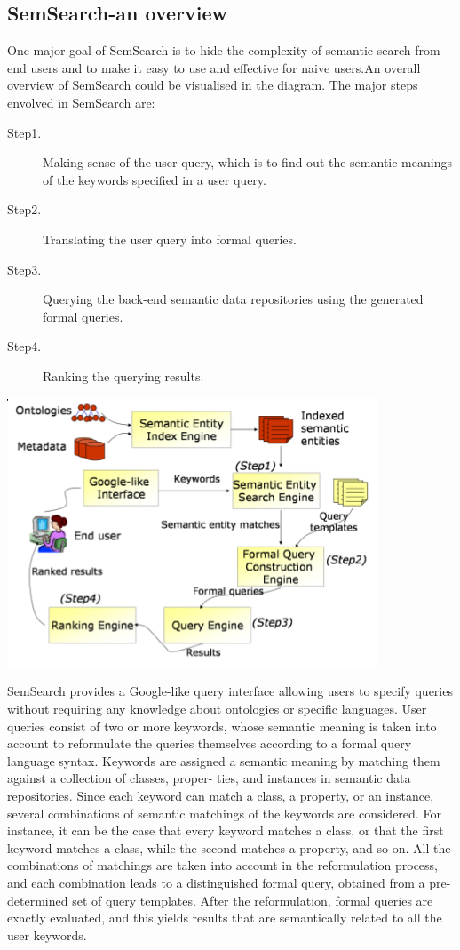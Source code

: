 \documentclass[12pt,a4]{article}
\begin{document}
\subsection{SemSearch-an overview\cite{semsrch}}
One major goal of SemSearch is to hide the complexity of semantic search from end users and to make it easy to use and effective for naive users.An overall overview of SemSearch could be visualised in the diagram. The major steps envolved in SemSearch are:
\begin{description}
\item[Step1.] Making sense of the user query, which is to find out the semantic meanings of the keywords specified in a user query.
\item[Step2.] Translating the user query into formal queries.
\item[Step3.] Querying the back-end semantic data repositories using the generated formal queries.
\item[Step4.] Ranking the querying results.
\end{description}
\begin{center}\includegraphics[height = 8cm]{./img/sem_srch.png}\end{center}
SemSearch provides a Google-like query interface allowing users to specify queries without requiring any knowledge about ontologies or specific languages. User queries consist of two or more keywords, whose semantic meaning is taken into account to reformulate the queries themselves according to a formal query language syntax. Keywords are assigned a semantic meaning by matching them against a collection of classes, proper-
ties, and instances in semantic data repositories. Since each keyword can match a class, a property, or an instance, several combinations of semantic matchings of the keywords are considered. For instance, it can be the case that every keyword matches a class, or that the first keyword matches a class, while the second matches a property, and so on. All the combinations of matchings are taken into account in the reformulation process, and each combination leads to a distinguished formal query, obtained from a pre-determined set of query templates. After the reformulation, formal queries are exactly evaluated, and this yields results that are semantically related to all the user keywords.
\end{document}
